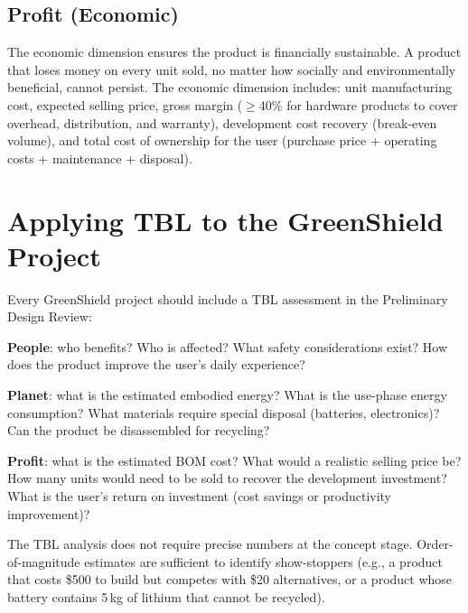 \documentclass[11pt,letterpaper,twoside,openany]{book}
\begin{document}
\subsection{Profit (Economic)}
The economic dimension ensures the product is financially sustainable. A product that loses money on every unit sold, no matter how socially and environmentally beneficial, cannot persist. The economic dimension includes: unit manufacturing cost, expected selling price, gross margin ($\geq$40\% for hardware products to cover overhead, distribution, and warranty), development cost recovery (break-even volume), and total cost of ownership for the user (purchase price + operating costs + maintenance + disposal).

\section{Applying TBL to the GreenShield Project}
Every GreenShield project should include a TBL assessment in the Preliminary Design Review:

\textbf{People}: who benefits? Who is affected? What safety considerations exist? How does the product improve the user's daily experience?

\textbf{Planet}: what is the estimated embodied energy? What is the use-phase energy consumption? What materials require special disposal (batteries, electronics)? Can the product be disassembled for recycling?

\textbf{Profit}: what is the estimated BOM cost? What would a realistic selling price be? How many units would need to be sold to recover the development investment? What is the user's return on investment (cost savings or productivity improvement)?

The TBL analysis does not require precise numbers at the concept stage. Order-of-magnitude estimates are sufficient to identify show-stoppers (e.g., a product that costs \$500 to build but competes with \$20 alternatives, or a product whose battery contains 5\,kg of lithium that cannot be recycled).
\end{document}
